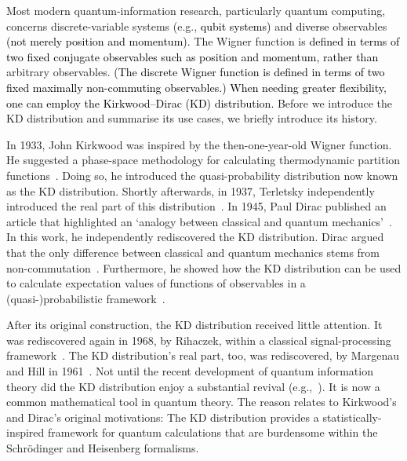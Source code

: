 \documentclass[%
 reprint,
superscriptaddress,
nofootinbib,
bibnotes,
 amsmath,amssymb,
 aps,
]{revtex4-1}
\theoremstyle{plain}
\newcommand{\Dave}[1]{\textcolor{black}{#1} }
\newcommand{\nicole}[1]{\textcolor{black}{#1} }
\begin{document}
Most modern quantum-information research, particularly quantum computing, concerns discrete-variable systems (e.g., \nicole{qubit systems)}
and 
\nicole{diverse}
observables 
\nicole{(not merely position and momentum).}
The Wigner function is \Dave{defined 
\nicole{in terms of} two fixed conjugate observables such as position and momentum, }
\nicole{rather than} arbitrary observables.  \Dave{(The discrete Wigner function \cite{bjork2008discrete} is defined in terms of two fixed maximally non-commuting observables.)}
\nicole{When needing greater flexibility, one can employ the Kirkwood--Dirac (KD) distribution.} 
 Before we introduce the KD distribution and summarise its use cases, we briefly introduce its history.

In 1933, John Kirkwood was inspired by the then-one-year-old Wigner function. He suggested a phase-space methodology for calculating thermodynamic partition functions~\cite{Kirkwood33}. Doing so, he introduced the quasi-probability distribution now known as the KD distribution.   Shortly afterwards,  in 1937,  Terletsky  independently introduced the real part of this distribution~\cite{Terletsky37, Margenau61}.  
In 1945, Paul Dirac published an article that highlighted an `analogy between classical and quantum mechanics'~\cite{Dirac45}.   In this work, he independently rediscovered the KD distribution.  Dirac argued that the only difference between classical and quantum mechanics stems from non-commutation~\cite{Dirac26, Dirac26-2, Dirac45}. Furthermore, he showed how the KD distribution can be used to calculate expectation values of  functions of observables in a (quasi-)probabilistic framework~\cite{Dirac45}.  



After its original construction, the KD distribution received little attention. It was rediscovered again in 1968, by Rihaczek, 
within a classical signal-processing framework~\cite{Rihaczek68}.  The KD distribution's real part, too, was rediscovered, by Margenau and Hill in 1961~\cite{Margenau61, Johansen04, Johansen04-2}. 
Not until  the recent development of  quantum information theory did the KD distribution  enjoy a substantial revival (e.g.,~\cite{Johansen04-2,NYH_jarzynski_2017,allahverdyan_nonequilibrium_2014}).  
It is now a \Dave{common} mathematical tool in quantum theory.  The reason relates to Kirkwood's and Dirac's original motivations: The KD distribution provides a statistically-inspired framework for quantum calculations that are burdensome within the Schr\"odinger and Heisenberg formalisms.  
\end{document}
